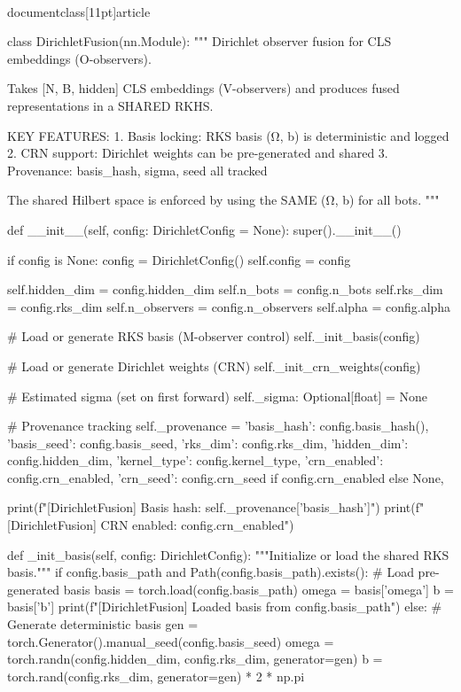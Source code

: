 \\documentclass[11pt]{article}
\begin{document}
\begin{CodeBlock}
class DirichletFusion(nn.Module):
    """
    Dirichlet observer fusion for CLS embeddings (O-observers).
    
    Takes [N, B, hidden] CLS embeddings (V-observers) and produces
    fused representations in a SHARED RKHS.
    
    KEY FEATURES:
    1. Basis locking: RKS basis (Ω, b) is deterministic and logged
    2. CRN support: Dirichlet weights can be pre-generated and shared
    3. Provenance: basis_hash, sigma, seed all tracked
    
    The shared Hilbert space is enforced by using the SAME (Ω, b) for all bots.
    """
    
    def __init__(self, config: DirichletConfig = None):
        super().__init__()
        
        if config is None:
            config = DirichletConfig()
        self.config = config
        
        self.hidden_dim = config.hidden_dim
        self.n_bots = config.n_bots
        self.rks_dim = config.rks_dim
        self.n_observers = config.n_observers
        self.alpha = config.alpha
        
        # Load or generate RKS basis (M-observer control)
        self._init_basis(config)
        
        # Load or generate Dirichlet weights (CRN)
        self._init_crn_weights(config)
        
        # Estimated sigma (set on first forward)
        self._sigma: Optional[float] = None
        
        # Provenance tracking
        self._provenance = {
            'basis_hash': config.basis_hash(),
            'basis_seed': config.basis_seed,
            'rks_dim': config.rks_dim,
            'hidden_dim': config.hidden_dim,
            'kernel_type': config.kernel_type,
            'crn_enabled': config.crn_enabled,
            'crn_seed': config.crn_seed if config.crn_enabled else None,
        }
        
        print(f"[DirichletFusion] Basis hash: {self._provenance['basis_hash']}")
        print(f"[DirichletFusion] CRN enabled: {config.crn_enabled}")
    
    def _init_basis(self, config: DirichletConfig):
        """Initialize or load the shared RKS basis."""
        if config.basis_path and Path(config.basis_path).exists():
            # Load pre-generated basis
            basis = torch.load(config.basis_path)
            omega = basis['omega']
            b = basis['b']
            print(f"[DirichletFusion] Loaded basis from {config.basis_path}")
        else:
            # Generate deterministic basis
            gen = torch.Generator().manual_seed(config.basis_seed)
            omega = torch.randn(config.hidden_dim, config.rks_dim, generator=gen)
            b = torch.rand(config.rks_dim, generator=gen) * 2 * np.pi
        

\end{CodeBlock}
\end{document}
